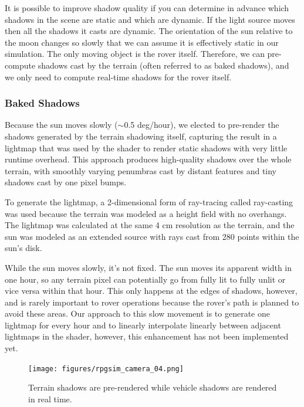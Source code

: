 \documentclass[twocolumn,letterpaper]{IEEEAerospaceCLS}  %
\begin{document}
It is possible to improve shadow quality if you can determine in advance which shadows in the scene are static and which are dynamic.  
If the light source moves then all the shadows it casts are dynamic.  
The orientation of the sun relative to the moon changes so slowly that we can assume it is effectively static in our simulation.  
The only moving object is the rover itself.  
Therefore, we can pre-compute shadows cast by the terrain (often referred to as baked shadows), and we only need to compute real-time shadows for the rover itself.  

\subsubsection{Baked Shadows}

Because the sun moves slowly ($\sim$0.5 deg/hour), we elected to pre-render the shadows generated by the terrain shadowing itself, capturing the result in a lightmap that was used by the shader to render static shadows with very little runtime overhead.  
This approach produces high-quality shadows over the whole terrain, with smoothly varying penumbras cast by distant features and tiny shadows cast by one pixel bumps.  

To generate the lightmap, a 2-dimensional form of ray-tracing called ray-casting was used because the terrain was modeled as a height field with no overhangs.  
The lightmap was calculated at the same 4 cm resolution as the terrain, and the sun was modeled as an extended source with rays cast from 280 points within the sun's disk.

While the sun moves slowly, it's not fixed.  
The sun moves its apparent width in one hour, so any terrain pixel can potentially go from fully lit to fully unlit or vice versa within that hour.  
This only happens at the edges of shadows, however, and is rarely important to rover operations because the rover's path is planned to avoid these areas.  
Our approach to this slow movement is to generate one lightmap for every hour and to linearly interpolate linearly between adjacent lightmaps in the shader, however, this enhancement has not been implemented yet.

\begin{figure}[h!]
  \texttt{[image: figures/rpgsim\_camera\_04.png]}
  \caption{Terrain shadows are pre-rendered while vehicle shadows are rendered in real time.}
  \label{fig:baked_and_realtime_shadows}
\end{figure}
\end{document}
